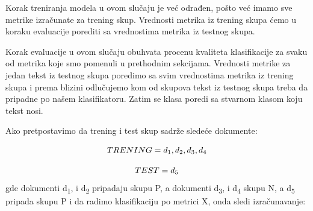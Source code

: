 \documentclass[12pt,oneside]{memoir}
\begin{document}
Korak treniranja modela u ovom slučaju je već odrađen, pošto već imamo sve metrike izračunate za trening skup. Vrednosti metrika iz trening skupa ćemo u koraku evaluacije porediti sa vrednostima metrika iz testnog skupa.

Korak evaluacije u ovom slučaju obuhvata procenu kvaliteta klasifikacije za svaku od metrika koje smo pomenuli u prethodnim sekcijama.  Vrednosti metrike za jedan tekst iz testnog skupa poredimo sa svim vrednostima metrika iz trening skupa i prema blizini odlučujemo kom od skupova tekst iz testnog skupa treba da pripadne po našem klasifikatoru. Zatim se klasa poredi sa stvarnom klasom koju tekst nosi. 

Ako pretpostavimo da trening i test skup sadrže sledeće dokumente:

\begin{equation}
	TRENING = {d\textsubscript{1}, d\textsubscript{2}, d\textsubscript{3},d \textsubscript{4}}
\end{equation}

\begin{equation}
	TEST = {d\textsubscript{5}}
\end{equation}
{\setlength{\parindent}{0cm}
gde dokumenti d\textsubscript{1}, i d\textsubscript{2} pripadaju skupu P,  a dokumenti d\textsubscript{3}, i d\textsubscript{4} skupu N, a d\textsubscript{5} pripada skupu P
}
i da radimo klasifikaciju po metrici X, onda sledi izračunavanje:
\end{document}
